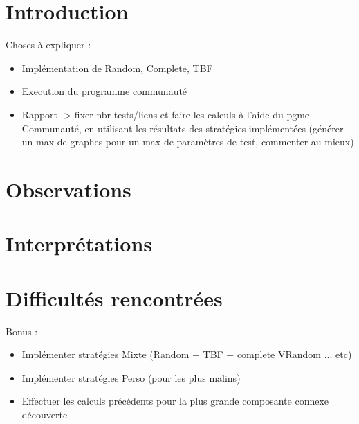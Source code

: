\documentclass[11pt, a4paper]{article}
\begin{document}

\section{Introduction}

Choses à expliquer :

\begin{itemize}
\item Implémentation de Random, Complete, TBF
\item Execution du programme communauté
\item Rapport -> fixer nbr tests/liens et faire
les calculs à l'aide du pgme Communauté, en utilisant
les résultats des stratégies implémentées (générer un max de graphes pour
un max de paramètres de test, commenter au mieux)
\end{itemize}




\section{Observations}

\section{Interprétations}

\section{Difficultés rencontrées}



Bonus :
\begin{itemize}
\item Implémenter stratégies Mixte (Random + TBF + complete  VRandom ... etc)
\item Implémenter stratégies Perso (pour les plus malins)
\item Effectuer les calculs précédents pour la plus grande composante connexe découverte
\end{itemize}
\end{document}
